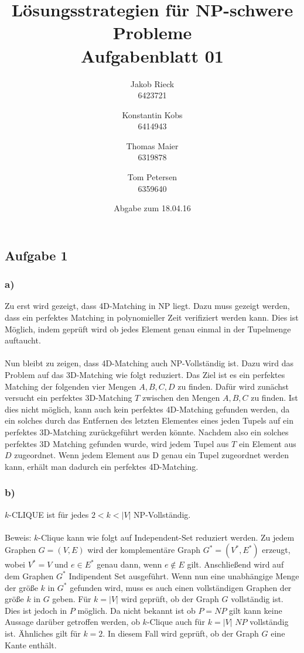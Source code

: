 \documentclass[12pt,a4paper]{article}
\title{Lösungsstrategien für NP-schwere Probleme\\Aufgabenblatt 01}
\author{
		Jakob Rieck\\
		\small{6423721}
	\and
		Konstantin Kobs\\
		\small{6414943}
	\and
		Thomas Maier\\
		\small{6319878}
	\and
		Tom Petersen\\
		\small{6359640}
}
\date{Abgabe zum 18.04.16}
\begin{document}
\maketitle

\subsection*{Aufgabe 1}

\subsubsection*{a)}
Zu erst wird gezeigt, dass 4D-Matching in NP liegt. Dazu muss gezeigt werden, dass ein perfektes Matching in polynomieller Zeit verifiziert werden kann. Dies ist Möglich, indem geprüft wird ob jedes Element genau einmal in der Tupelmenge auftaucht.
\\\\
Nun bleibt zu zeigen, dass 4D-Matching auch NP-Vollständig ist. Dazu wird das Problem auf das 3D-Matching wie folgt reduziert. Das Ziel ist es ein perfektes Matching der folgenden vier Mengen $A, B, C, D$ zu finden. Dafür wird zunächst versucht ein perfektes 3D-Matching $T$ zwischen den Mengen $A,B,C$ zu finden. Ist dies nicht möglich, kann auch kein perfektes 4D-Matching gefunden werden, da ein solches durch das Entfernen des letzten Elementes eines jeden Tupels auf ein perfektes 3D-Matching zurückgeführt werden könnte.  Nachdem also ein solches perfektes 3D Matching gefunden wurde, wird jedem Tupel aus $T$ ein Element aus $D$ zugeordnet. Wenn jedem Element aus D genau ein Tupel zugeordnet werden kann, erhält man dadurch ein perfektes 4D-Matching.

\subsubsection*{b)}
$k$-CLIQUE ist für jedes $2 < k < |V|$ NP-Vollständig. 
\\\\
Beweis: $k$-Clique kann wie folgt auf Independent-Set reduziert werden.
Zu jedem Graphen $G=(V,E)$ wird der komplementäre Graph $G^*=(V^*,E^*)$ erzeugt, wobei $V^*=V$ und $e \in E^*$ genau dann, wenn $e \notin E$ gilt. Anschließend wird auf dem Graphen $G^*$ Indipendent Set ausgeführt. Wenn nun eine unabhängige Menge der größe $k$ in $G^*$ gefunden wird, muss es auch einen vollständigen Graphen der größe $k$ in $G$ geben.
Für $k=|V|$ wird geprüft, ob der Graph $G$ vollständig ist. Dies ist jedoch in $P$ möglich. Da nicht bekannt ist ob $P=NP$ gilt kann keine Aussage darüber getroffen werden, ob $k$-Clique auch für $k=|V|$ $NP$ vollständig ist. Ähnliches gilt für $k=2$. In diesem Fall wird geprüft, ob der Graph $G$ eine Kante enthält.
\end{document}
